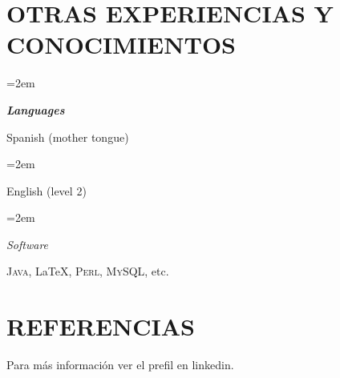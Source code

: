 \documentclass[paper=a4,fontsize=11pt]{scrartcl} %
\newlength{\spacebox}
\newcommand{\sepspace}{\vspace*{1em}}		%
\newcommand{\NewPart}[1]{\section*{\uppercase{#1}}}
\newcommand{\PersonalEntry}[2]{
		\noindent\hangindent=2em\hangafter=0 %
		\parbox{\spacebox}{        %
		\textit{#1}}		       %
		\hspace{1.5em} #2 \par}    %
\newcommand{\SkillsEntry}[2]{      %
		\noindent\hangindent=2em\hangafter=0 %
		\parbox{\spacebox}{        %
		\textit{#1}}			   %
		\hspace{1.5em} #2 \par}    %
\begin{document}
\sepspace

\NewPart{Otras Experiencias y Conocimientos}{}

\sepspace

\SkillsEntry{\textbf{Languages}}{Spanish (mother tongue)}
\SkillsEntry{}{English (level 2)}

\sepspace

\SkillsEntry{Software}{
\textsc{Java}, \LaTeX, \textsc{Perl}, \textsc{MySQL}, etc.
}


\NewPart{Referencias}{}
Para más información ver el prefil en linkedin.

\sepspace
\end{document}
